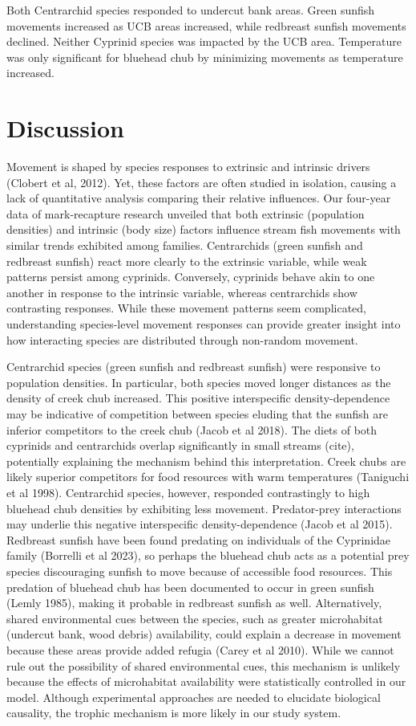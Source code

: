\documentclass[11pt, class=article, crop=false]{standalone}
\begin{document}
Both Centrarchid species responded to undercut bank areas. Green sunfish movements increased as UCB areas increased, while redbreast sunfish movements declined. Neither Cyprinid species was impacted by the UCB area. Temperature was only significant for bluehead chub by minimizing movements as temperature increased. 

\section{Discussion}

Movement is shaped by species responses to extrinsic and intrinsic drivers (Clobert et al, 2012). Yet, these factors are often studied in isolation, causing a lack of quantitative analysis comparing their relative influences. Our four-year data of mark-recapture research unveiled that both extrinsic (population densities) and intrinsic (body size) factors influence stream fish movements with similar trends exhibited among families. Centrarchids (green sunfish and redbreast sunfish) react more clearly to the extrinsic variable, while weak patterns persist among cyprinids. Conversely, cyprinids behave akin to one another in response to the intrinsic variable, whereas centrarchids show contrasting responses. While these movement patterns seem complicated, understanding species-level movement responses can provide greater insight into how interacting species are distributed through non-random movement. 

Centrarchid species (green sunfish and redbreast sunfish) were responsive to population densities. In particular, both species moved longer distances as the density of creek chub increased. This positive interspecific density-dependence may be indicative of competition between species eluding that the sunfish are inferior competitors to the creek chub (Jacob et al 2018). The diets of both cyprinids and centrarchids overlap significantly in small streams (cite), potentially explaining the mechanism behind this interpretation. Creek chubs are likely superior competitors for food resources with warm temperatures (Taniguchi et al 1998). Centrarchid species, however, responded contrastingly to high bluehead chub densities by exhibiting less movement. Predator-prey interactions may underlie this negative interspecific density-dependence  (Jacob et al 2015). Redbreast sunfish have been found predating on individuals of the Cyprinidae family (Borrelli et al 2023), so perhaps the bluehead chub acts as a potential prey species discouraging sunfish to move because of accessible food resources. This predation of bluehead chub has been documented to occur in green sunfish (Lemly 1985), making it probable in redbreast sunfish as well. Alternatively, shared environmental cues between the species, such as greater microhabitat (undercut bank, wood debris) availability, could explain a decrease in movement because these areas provide added refugia (Carey et al 2010). While we cannot rule out the possibility of shared environmental cues, this mechanism is unlikely because the effects of microhabitat availability were statistically controlled in our model. Although experimental approaches are needed to elucidate biological causality, the trophic mechanism is more likely in our study system. 
\end{document}
